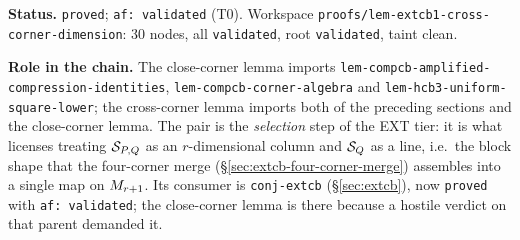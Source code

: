\medskip
\noindent\textbf{Status.} \texttt{proved}; \texttt{af: validated} (T0). Workspace
\texttt{proofs/lem-extcb1-cross-corner-dimension}: 30 nodes, all \texttt{validated}, root
\texttt{validated}, taint clean.

\noindent\textbf{Role in the chain.} The close-corner lemma imports
\texttt{lem-compcb-amplified-compression-identities},
\texttt{lem-compcb-corner-algebra} and \texttt{lem-hcb3-uniform-square-lower}; the
cross-corner lemma imports both of the preceding sections and the close-corner lemma. The
pair is the \emph{selection} step of the EXT tier: it is what licenses treating
$\mathcal S_{P,Q}$ as an $r$-dimensional column and $\mathcal S_{Q}$ as a line, i.e.\ the block shape
that the four-corner merge (\S\ref{sec:extcb-four-corner-merge}) assembles into a single
map on $M_{r+1}$. Its consumer is \texttt{conj-extcb} (\S\ref{sec:extcb}), now
\texttt{proved} with \texttt{af: validated}; the close-corner lemma is there because a
hostile verdict on that parent demanded it.

